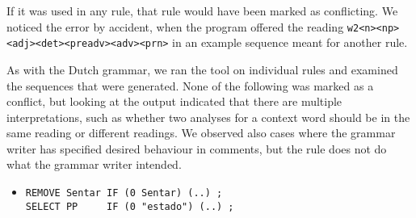 If it was used in any rule, that rule would have been marked as
conflicting. We noticed the error by accident, when the program
offered the reading \texttt{w2<n><np><adj><det><preadv><adv><prn>}
in an example sequence meant for another rule.


As with the Dutch grammar, we ran the tool on individual rules and
examined the sequences that were generated. None of the following was
marked as a conflict, but looking at the output indicated that there
are multiple interpretations, such as whether two analyses for a
context word should be in the same reading or different readings.
We observed also cases where the grammar writer has specified desired
behaviour in comments, but the rule does not do what the grammar
writer intended. 







\begin{itemize}
\item[]\begin{verbatim}
REMOVE Sentar IF (0 Sentar) (..) ;
SELECT PP     IF (0 "estado") (..) ;
\end{verbatim}
\end{itemize}

